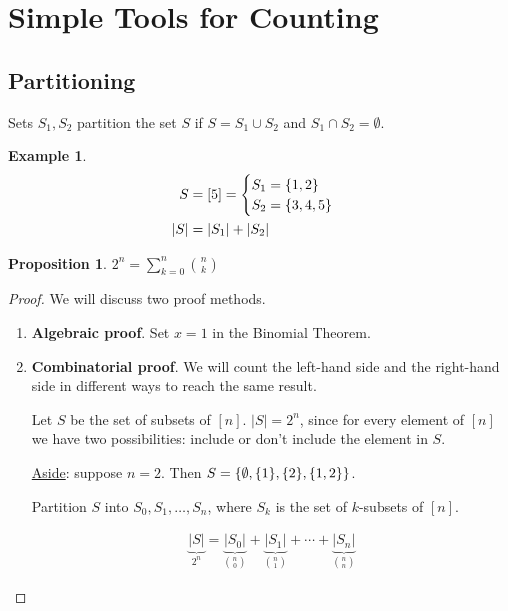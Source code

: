 \documentclass[]{article}
\newtheorem*{proposition}{Proposition}
\theoremstyle{definition}
\newtheorem{ex}{Example}[section]
\newcommand{\union}{\cup}
\newcommand{\intersection}{\cap}
\DeclarePairedDelimiter{\set}{\lbrace}{\rbrace}
\begin{document}
		\section{Simple Tools for Counting}
			\subsection{Partitioning}
				Sets $S_1, S_2$ partition the set $S$ if $S = S_1 \union S_2$ and $S_1 \intersection S_2 = \emptyset$.
				
				\begin{ex}
					\begin{align*}
						S &= [5] = \begin{cases} 
							S_1 = \set{1, 2 } \\
							S_2 = \set{3, 4, 5}
						\end{cases} \\
						|S| &= |S_1| + |S_2|
					\end{align*}
				\end{ex}
				
				\begin{proposition}
					$\displaystyle 2^n = \sum_{k = 0}^{n} \binom{n}{k}$
				\end{proposition}
				
				\begin{proof}
					We will discuss two proof methods.
					
					\begin{enumerate}
						\item \textbf{Algebraic proof}. Set $x = 1$ in the Binomial Theorem.
						\item \textbf{Combinatorial proof}. We will count the left-hand side and the right-hand side in different ways to reach the same result.
						
						Let $S$ be the set of subsets of $[n]$. $|S| = 2^n$, since for every element of $[n]$ we have two possibilities: include or don't include the element in $S$.
						
						\underline{Aside}: suppose $n = 2$. Then $S = \set{\emptyset, \set{1}, \set{2}, \set{1, 2}}$. 
						
						Partition $S$ into $S_0, S_1, \ldots, S_n$, where $S_k$ is the set of $k$-subsets of $[n]$.
						
						\begin{align*}
							\underbrace{|S|}_{2^n} = \underbrace{|S_0|}_{\binom{n}{0}} + \underbrace{|S_1|}_{\binom{n}{1}} + \cdots + \underbrace{|S_n|}_{\binom{n}{n}}
						\end{align*}
					\end{enumerate}
				\end{proof}
				
\end{document}
